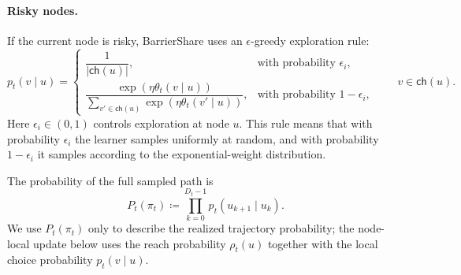 \documentclass{article}
\begin{document}
\paragraph{Risky nodes.}
If the current node is risky, BarrierShare uses an $\epsilon$-greedy exploration rule:
\begin{equation}
    p_t(v\mid u)
    =
    \begin{cases}
    \dfrac{1}{|\mathsf{ch}(u)|}, & \text{with probability } \epsilon_i, \\[8pt]
    \dfrac{\exp(\eta \theta_t(v\mid u))}{\sum_{v' \in \mathsf{ch}(u)} \exp(\eta \theta_t(v'\mid u))}, & \text{with probability } 1-\epsilon_i,
    \end{cases}
    \qquad v \in \mathsf{ch}(u).
    \label{eq:risky_selection}
\end{equation}
Here $\epsilon_i \in (0,1)$ controls exploration at node $u$. This rule means that with probability $\epsilon_i$ the learner samples uniformly at random, and with probability $1-\epsilon_i$ it samples according to the exponential-weight distribution.

The probability of the full sampled path is
\begin{equation}
    P_t(\pi_t) \coloneqq \prod_{k=0}^{D_t-1} p_t(u_{k+1}\mid u_k).
    \label{eq:path_prob}
\end{equation}
We use $P_t(\pi_t)$ only to describe the realized trajectory probability; the node-local update below uses the reach probability $\rho_t(u)$ together with the local choice probability $p_t(v\mid u)$.
\end{document}
